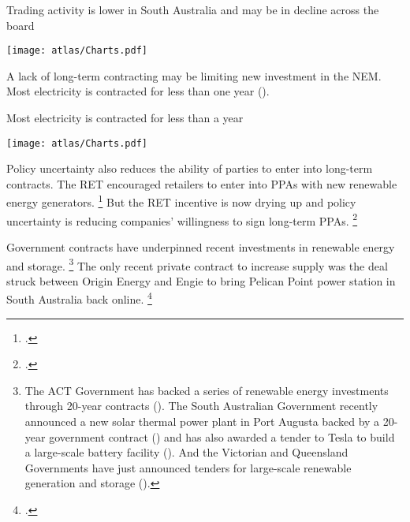 \documentclass[FrontPage]{grattan}
\begin{document}
\begin{figureTop}
\caption{Trading activity is lower in South Australia and may be in decline across the board}\label{fig:trading-activity-lower-in-South-Australia-and-may-be-in-decline-across-the-board}
\texttt{[image: atlas/Charts.pdf]}
\end{figureTop}

A lack of long-term contracting may be limiting new investment in the NEM\@. Most electricity is contracted for less than one year ().

\begin{figureTop}
\caption{Most electricity is contracted for less than a year}\label{fig:less-than-half-of-contracting-activity-is-longer-than-a-year}
\texttt{[image: atlas/Charts.pdf]}
\end{figureTop}

Policy uncertainty also reduces the ability of parties to enter into long-term contracts. The RET encouraged retailers to enter into PPAs with new renewable energy generators.%
\footcite{anderson2007forwardcontracts}
But the RET incentive is now drying up and policy uncertainty is reducing companies' willingness to sign long-term PPAs.%
\footcites[][20]{ChiefEcon2015ElectricityGenProjects}{Abernethy2017PPAs}

Government contracts have underpinned recent investments in renewable energy and storage.%
\footnote{The ACT Government has backed a series of renewable energy investments through 20-year contracts (\textcite{ACTrenewablesauctions2016}). The South Australian Government recently announced a new solar thermal power plant in Port Augusta backed by a 20-year government contract (\textcite{ABC2017SolarThermalPortAugusta}) and has also awarded a tender to Tesla to build a large-scale battery facility (\textcite{Harmsen2017TeslaBatterySA}). And the Victorian and Queensland Governments have just announced tenders for large-scale renewable generation and storage (\textcites{VICrenewablesauctions2017}{QLDrenewablesauctions2017}).}
The only recent private contract to increase supply was the deal struck between Origin Energy and Engie to bring Pelican Point power station in South Australia back online.%
\footcite{AFR2017PelicanPointGasPrice}
\end{document}
